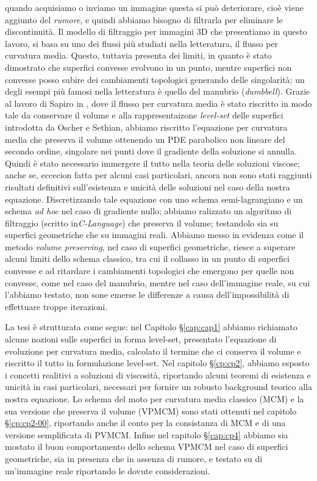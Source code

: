 quando acquisiamo o inviamo un immagine questa si può deteriorare, cioè 
viene aggiunto del \emph{rumore}, e quindi abbiamo bisogno di
filtrarla per eliminare le discontinuità. Il modello di filtraggio per
immagini 3D che presentiamo in questo lavoro, si basa su uno dei flussi più
studiati nella letteratura, il flusso per curvatura media. Questo,
tuttavia presenta dei limiti, in quanto è stato dimostrato che
superfici convesse evolvono in un punto, mentre superfici
non convesse posso subire dei cambiamenti topologici generando delle
singolarità; un degli esempi più famosi nella letteratura è quello del
manubrio (\emph{dumbbell}). Grazie al lavoro di Sapiro in
\cite[][]{gui:sapiro}, dove il flusso per curvatura media è stato
riscritto in modo tale da conservare il volume e alla rappresentaizone
\emph{level-set} delle superfici introdotta da Oscher e Sethian,
abbiamo riscritto l'equazione per curvatura media che preserva il
volume ottenendo un PDE parabolico non lineare del secondo ordine,
singolare nei punti dove il gradiente della soluzione si
annulla. Quindi è stato necessario immergere il tutto nella teoria
delle soluzioni viscose; anche se, eccecion fatta per alcuni casi
particolari, ancora non sono stati raggiunti risultati definitivi
sull'esistenza e unicità delle soluzioni nel caso della nostra
equazione. Discretizzando tale equazione con uno schema
semi-lagrangiano e un schema \emph{ad hoc} nel caso di gradiente 
nullo; abbiamo ralizzato un algoritmo di filtraggio (scritto
in\emph{C-Language}) che preserva il volume; testandolo sia su superfici
geometriche che su immagini reali. Abbiamo messo in evidenza come il metodo
\emph{volume preserving}, nel caso di superfici geometriche, riesce a
superare alcuni limiti dello schema classico, tra cui il collasso in
un punto di superfici convesse e ad ritardare i cambiamenti topologici
che emergono per quelle non convesse, come nel caso del manubrio,
mentre nel caso dell'immagine reale, su cui l'abbiamo testato, non
sone emerse le differenze a causa  dell'impossibilità di effettuare
troppe iterazioni.

La tesi è strutturata come segue: nel Capitolo §\ref{cap:cap1} abbiamo
richiamato alcune nozioni sulle superfici in forma level-set,
presentato l'equazione di evoluzione per curvatura media, calcolato il
termine che ci conserva il volume e riscritto il tutto in formulazione
level-set. Nel capitolo §\ref{cp:cp2}, abbiamo esposto i concetti
realitivi a soluzioni di viscosità, riportando alcuni teoremi di
esistenza e unicità in casi particolari, necessari per fornire un
robusto background teorico alla nostra equazione. Lo schema del moto
per curvatura media classico (MCM) e la sua versione che preserva il
volume (VPMCM) sono stati ottenuti nel capitolo §\ref{cp:cp2-00},
riportando anche il conto per la consistanza di MCM e di una versione
semplificata di PVMCM. Infine nel capitolo §\ref{cap:cp4} abbiamo
sia mostato il buon comportamento dello schema VPMCM nel caso di superfici
geometriche, sia in presenza che in assenza di rumore, e testato su di
un'immagine reale riportando le dovute considerazioni. 
   
